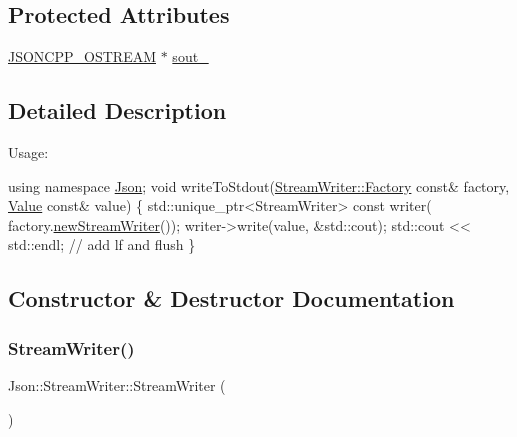 \subsection*{Protected Attributes}
\begin{DoxyCompactItemize}
\item 
\hyperlink{json_8h_a37a25be5fca174927780caeb280094ce_a37a25be5fca174927780caeb280094ce}{J\+S\+O\+N\+C\+P\+P\+\_\+\+O\+S\+T\+R\+E\+AM} $\ast$ \hyperlink{classJson_1_1StreamWriter_a4f5603d4228a9fa46a42cb44e5234d9b_a4f5603d4228a9fa46a42cb44e5234d9b}{sout\+\_\+}
\end{DoxyCompactItemize}


\subsection{Detailed Description}
Usage\+: 
\begin{DoxyCode}
\textcolor{keyword}{using namespace }\hyperlink{namespaceJson}{Json};
\textcolor{keywordtype}{void} writeToStdout(\hyperlink{classJson_1_1StreamWriter_1_1Factory}{StreamWriter::Factory} \textcolor{keyword}{const}& factory, 
      \hyperlink{classJson_1_1Value}{Value} \textcolor{keyword}{const}& value) \{
  std::unique\_ptr<StreamWriter> \textcolor{keyword}{const} writer(
    factory.\hyperlink{classJson_1_1StreamWriter_1_1Factory_a9d30ec53e8288cd53befccf1009c5f31_a9d30ec53e8288cd53befccf1009c5f31}{newStreamWriter}());
  writer->write(value, &std::cout);
  std::cout << std::endl;  \textcolor{comment}{// add lf and flush}
\}
\end{DoxyCode}
 

\subsection{Constructor \& Destructor Documentation}
\mbox{\label{classJson_1_1StreamWriter_a66e6f5113618ce6b04cac9b3c85a3707_a66e6f5113618ce6b04cac9b3c85a3707}} 
\subsubsection{\texorpdfstring{Stream\+Writer()}{StreamWriter()}}
{\footnotesize\ttfamily Json\+::\+Stream\+Writer\+::\+Stream\+Writer (\begin{DoxyParamCaption}{ }\end{DoxyParamCaption})}

